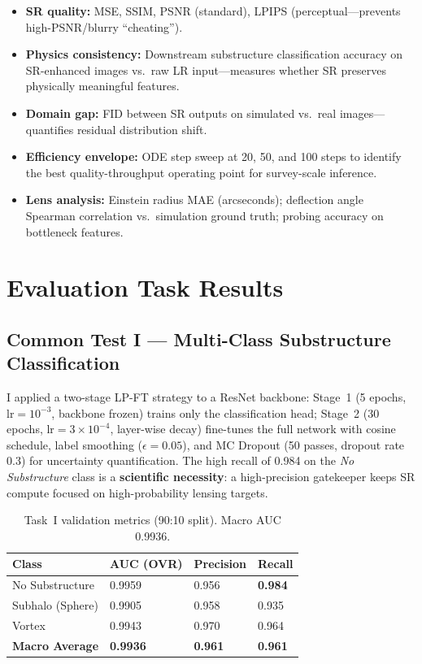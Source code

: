 \documentclass[11pt,a4paper]{article}
\begin{document}
\begin{itemize}
  \item \textbf{SR quality:} MSE, SSIM, PSNR (standard), LPIPS (perceptual---prevents high-PSNR/blurry ``cheating'').
  \item \textbf{Physics consistency:} Downstream substructure classification accuracy on SR-enhanced images vs.\ raw LR input---measures whether SR preserves physically meaningful features.
  \item \textbf{Domain gap:} FID between SR outputs on simulated vs.\ real images---quantifies residual distribution shift.
  \item \textbf{Efficiency envelope:} ODE step sweep at 20, 50, and 100 steps to identify the best quality-throughput operating point for survey-scale inference.
  \item \textbf{Lens analysis:} Einstein radius MAE (arcseconds); deflection angle Spearman correlation vs.\ simulation ground truth; probing accuracy on bottleneck features.
\end{itemize}

\vspace{6pt}

\section{Evaluation Task Results}

\subsection{Common Test I --- Multi-Class Substructure Classification}

I applied a two-stage LP-FT strategy to a ResNet backbone: Stage~1 (5 epochs, lr$=10^{-3}$, backbone frozen) trains only the classification head; Stage~2 (30 epochs, lr$=3\times10^{-4}$, layer-wise decay) fine-tunes the full network with cosine schedule, label smoothing ($\epsilon=0.05$), and MC Dropout (50 passes, dropout rate 0.3) for uncertainty quantification. The high recall of 0.984 on the \emph{No Substructure} class is a \textbf{scientific necessity}: a high-precision gatekeeper keeps SR compute focused on high-probability lensing targets.

\begin{table}[h!]
\centering
\caption{Task~I validation metrics (90:10 split). Macro AUC 0.9936.}
\begin{tabular}{L{4.2cm} C{2.5cm} C{2.5cm} C{2.5cm}}
\toprule
\textbf{Class} & \textbf{AUC (OVR)} & \textbf{Precision} & \textbf{Recall} \\
\midrule
No Substructure  & 0.9959 & 0.956 & \textbf{0.984} \\
Subhalo (Sphere) & 0.9905 & 0.958 & 0.935 \\
Vortex           & 0.9943 & 0.970 & 0.964 \\
\midrule
\textbf{Macro Average} & \textbf{0.9936} & \textbf{0.961} & \textbf{0.961} \\
\bottomrule
\end{tabular}
\end{table}
\end{document}
